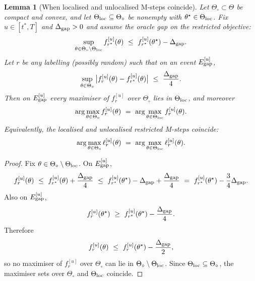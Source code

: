 \documentclass{statsoc}
\newtheorem{lemma}[lemma]{Lemma}
\newcommand{\1}{\mathbbm{1}}
\begin{document}
\begin{lemma}[When localised and unlocalised M-steps coincide]\label{lem:Mstep-coincide}
Let $\Theta_\circ\subset\Theta$ be compact and convex, and let $\Theta_{\rm loc}\subseteq \Theta_\circ$ be nonempty
with $\theta^\star\in\Theta_{\rm loc}$. Fix $u\in[t^\ast,T]$ and $\Delta_{\rm gap}>0$ and assume the oracle gap on the
restricted objective:
\begin{equation}\label{eq:oracle-gap}
\sup_{\theta\in \Theta_\circ\setminus \Theta_{\rm loc}} f_{r^\star}^{[u]}(\theta)
\ \le\ f_{r^\star}^{[u]}(\theta^\star)-\Delta_{\rm gap}.
\end{equation}
Let $r$ be any labelling (possibly random) such that on an event $E_{\rm gap}^{[u]}$,
\begin{equation}\label{eq:uniform-perturb-gap}
\sup_{\theta\in\Theta_\circ}\big|f_r^{[u]}(\theta)-f_{r^\star}^{[u]}(\theta)\big|
\ \le\ \frac{\Delta_{\rm gap}}{4}.
\end{equation}
Then on $E_{\rm gap}^{[u]}$ every maximiser of $f_r^{[u]}$ over $\Theta_\circ$ lies in $\Theta_{\rm loc}$, and moreover
\[
\arg\max_{\theta\in\Theta_\circ} f_r^{[u]}(\theta)
\ =\ \arg\max_{\theta\in\Theta_{\rm loc}} f_r^{[u]}(\theta).
\]
Equivalently, the localised and unlocalised restricted M-steps coincide:
\[
\arg\max_{\theta\in\Theta_\circ}\ell_r^{[u]}(\theta)
\ =\ \arg\max_{\theta\in\Theta_{\rm loc}}\ell_r^{[u]}(\theta).
\]
\end{lemma}

\begin{proof}
Fix $\theta\in\Theta_\circ\setminus\Theta_{\rm loc}$. On $E_{\rm gap}^{[u]}$,
\[
f_r^{[u]}(\theta)\ \le\ f_{r^\star}^{[u]}(\theta)+\frac{\Delta_{\rm gap}}{4}
\ \le\ f_{r^\star}^{[u]}(\theta^\star)-\Delta_{\rm gap}+\frac{\Delta_{\rm gap}}{4}
\ =\ f_{r^\star}^{[u]}(\theta^\star)-\frac{3}{4}\Delta_{\rm gap}.
\]
Also on $E_{\rm gap}^{[u]}$,
\[
f_r^{[u]}(\theta^\star)\ \ge\ f_{r^\star}^{[u]}(\theta^\star)-\frac{\Delta_{\rm gap}}{4}.
\]
Therefore
\[
f_r^{[u]}(\theta)\ \le\ f_r^{[u]}(\theta^\star)-\frac{\Delta_{\rm gap}}{2},
\]
so no maximiser of $f_r^{[u]}$ over $\Theta_\circ$ can lie in $\Theta_\circ\setminus\Theta_{\rm loc}$.
Since $\Theta_{\rm loc}\subseteq\Theta_\circ$, the maximiser sets over $\Theta_\circ$ and $\Theta_{\rm loc}$ coincide.
\end{proof}
\end{document}
